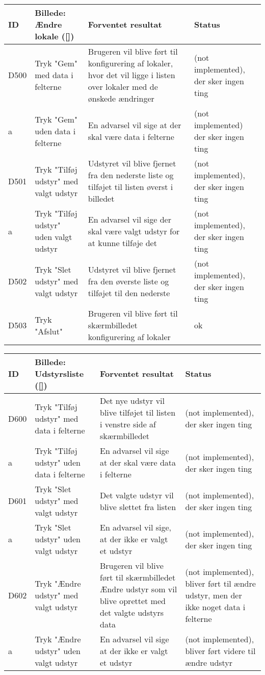 \begin{tabular}{ |p{1cm}| p{5cm} | p{4cm} | p{1cm} | }
\hline
ID & Billede: Ændre lokale (\ref{})  & Forventet resultat & Status\\ 
\hline
D500 & Tryk "Gem" med data i felterne & Brugeren vil blive ført til konfigurering af lokaler, hvor det vil ligge i listen over lokaler med de ønskede ændringer  & (not implemented), der sker ingen ting\\
\hline
a & Tryk "Gem" uden data i felterne & En advarsel vil sige at der skal være data i felterne &(not implemented) der sker ingen ting \\
\hline
D501 & Tryk "Tilføj udstyr" med valgt udstyr & Udstyret vil blive fjernet fra den nederste liste og tilføjet til listen øverst i billedet &(not implemented), der sker ingen ting \\
\hline
a & Tryk "Tilføj udstyr" uden valgt udstyr & En advarsel vil sige der skal være valgt udstyr for at kunne tilføje det &(not implemented), der sker ingen ting \\
\hline
D502 & Tryk "Slet udstyr" med valgt udstyr & Udstyret vil blive fjernet fra den øverste liste og tilføjet til den nederste  &(not implemented), der sker ingen ting \\
\hline
D503 & Tryk "Afslut" & Brugeren vil blive ført til skærmbilledet konfigurering af lokaler & ok\\
\hline
\end{tabular}

\begin{tabular}{ |p{1cm}| p{5cm} | p{4cm} | p{1cm} | }
\hline
ID & Billede: Udstyrsliste (\ref{})  & Forventet resultat & Status\\ 
\hline
D600 & Tryk "Tilføj udstyr" med data i felterne & Det nye udstyr vil blive tilføjet til listen i venstre side af skærmbilledet &(not implemented), der sker ingen ting \\
\hline
a & Tryk "Tilføj udstyr" uden data i felterne & En advarsel vil sige at der skal være data i felterne &(not implemented), der sker ingen ting \\
\hline
D601 & Tryk "Slet udstyr" med valgt udstyr & Det valgte udstyr vil blive slettet fra listen &(not implemented), der sker ingen ting \\
\hline
a & Tryk "Slet udstyr" uden valgt udstyr & En advarsel vil sige, at der ikke er valgt et udstyr &(not implemented), der sker ingen ting \\
\hline
D602 & Tryk "Ændre udstyr" med valgt udstyr & Brugeren vil blive ført til skærmbilledet Ændre udstyr som vil blive oprettet med det valgte udstyrs data &(not implemented), bliver ført til ændre udstyr, men der ikke noget data i felterne \\
\hline
a & Tryk "Ændre udstyr" uden valgt udstyr & En advarsel vil sige at der ikke er valgt et udstyr & (not implemented), bliver ført videre til ændre udstyr \\
\hline
\end{tabular}

